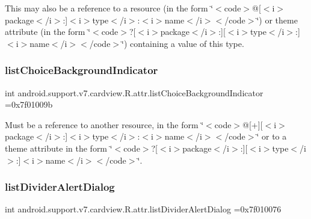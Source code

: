 This may also be a reference to a resource (in the form \char`\"{}$<$code$>$@\mbox{[}$<$i$>$package$<$/i$>$\+:\mbox{]}$<$i$>$type$<$/i$>$\+:$<$i$>$name$<$/i$>$$<$/code$>$\char`\"{}) or theme attribute (in the form \char`\"{}$<$code$>$?\mbox{[}$<$i$>$package$<$/i$>$\+:\mbox{]}\mbox{[}$<$i$>$type$<$/i$>$\+:\mbox{]}$<$i$>$name$<$/i$>$$<$/code$>$\char`\"{}) containing a value of this type. \mbox{\label{classandroid_1_1support_1_1v7_1_1cardview_1_1R_1_1attr_a0e0fd170b675856c067c0258df0adf4b}} 
\subsubsection{\texorpdfstring{list\+Choice\+Background\+Indicator}{listChoiceBackgroundIndicator}}
{\footnotesize\ttfamily int android.\+support.\+v7.\+cardview.\+R.\+attr.\+list\+Choice\+Background\+Indicator =0x7f01009b\hspace{0.3cm}{\ttfamily [static]}}

Must be a reference to another resource, in the form \char`\"{}$<$code$>$@\mbox{[}+\mbox{]}\mbox{[}$<$i$>$package$<$/i$>$\+:\mbox{]}$<$i$>$type$<$/i$>$\+:$<$i$>$name$<$/i$>$$<$/code$>$\char`\"{} or to a theme attribute in the form \char`\"{}$<$code$>$?\mbox{[}$<$i$>$package$<$/i$>$\+:\mbox{]}\mbox{[}$<$i$>$type$<$/i$>$\+:\mbox{]}$<$i$>$name$<$/i$>$$<$/code$>$\char`\"{}. \mbox{\label{classandroid_1_1support_1_1v7_1_1cardview_1_1R_1_1attr_a2782cc47afc140978337e9de1c8f70ec}} 
\subsubsection{\texorpdfstring{list\+Divider\+Alert\+Dialog}{listDividerAlertDialog}}
{\footnotesize\ttfamily int android.\+support.\+v7.\+cardview.\+R.\+attr.\+list\+Divider\+Alert\+Dialog =0x7f010076\hspace{0.3cm}{\ttfamily [static]}}

